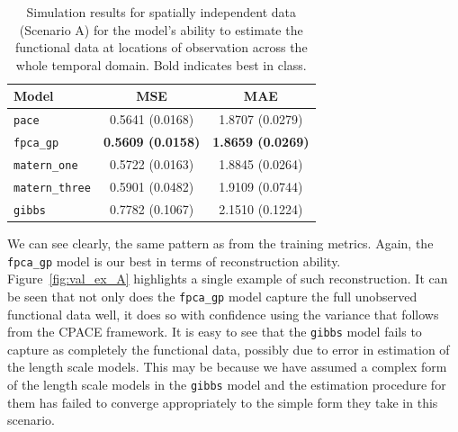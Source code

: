 \begin{table}
	\caption[Simulation results for Scenario A on validation data.]{Simulation results for spatially independent data (Scenario A) for the model's ability to estimate the functional data at locations of observation across the whole temporal domain. Bold indicates best in class.}
	\centering
	\label{tab:val_A}
	\begin{tabular}{lcc}
		\toprule
		\textbf{Model} & \textbf{MSE} & \textbf{MAE} \\
		\midrule
		\verb*|pace| & 0.5641 (0.0168) & 1.8707	(0.0279) \\
		\verb*|fpca_gp| & \textbf{0.5609 (0.0158)} & \textbf{1.8659 (0.0269)} \\
		\verb*|matern_one| & 0.5722	(0.0163) & 1.8845 (0.0264) \\
		\verb*|matern_three| & 0.5901 (0.0482) & 1.9109	(0.0744) \\
		\verb*|gibbs| & 0.7782 (0.1067) & 2.1510 (0.1224)\\
		\bottomrule
	\end{tabular}
\end{table}

We can see clearly, the same pattern as from the training metrics. 
Again, the \verb*|fpca_gp| model is our best in terms of reconstruction ability.
Figure~\ref{fig:val_ex_A} highlights a single example of such reconstruction.
It can be seen that not only does the \verb*|fpca_gp| model capture the full unobserved functional data well, it does so with confidence using the variance that follows from the CPACE framework.
It is easy to see that the \verb*|gibbs| model fails to capture as completely the functional data, possibly due to error in estimation of the  length scale models.
This may be because we have assumed a complex form of the length scale models in the \verb*|gibbs| model and the estimation procedure for them has failed to converge appropriately to the simple form they take in this scenario.

